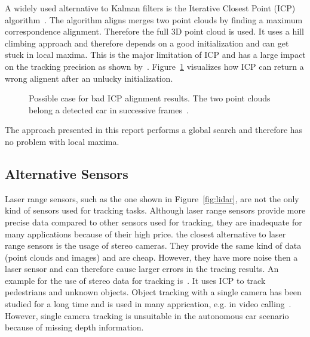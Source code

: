 \documentclass[twoside,a4paper,article]{combine}
\begin{document}
A widely used alternative to Kalman filters is the Iterative Closest
Point (ICP) algorithm~\cite{icp, icp2}. The algorithm aligns merges
two point clouds by finding a maximum correspondence
alignment. Therefore the full 3D point cloud is used. It
uses a hill climbing approach and therefore depends on a good
initialization and can get stuck in local maxima. This is the major
limitation of ICP and has a large impact on the tracking precision as
shown by~\cite{icp-bad, icp-bad2}. Figure~\ref{fig:icp} visualizes how
ICP can return a wrong alignent after an unlucky initialization.
\begin{figure}
  \label{fig:icp}
  \center
  
  \caption{Possible case for bad ICP alignment results. The two point
    clouds belong a detected car in successive frames~\cite{held-website}.}
\end{figure}
The approach presented in this report performs a global search and
therefore has no problem with local maxima.

\subsection{Alternative Sensors}
\label{sub:slternative-sensors}
Laser range sensors, such as the one shown in Figure~\ref{fig:lidar},
are not the only kind of sensors used for tracking tasks. Although
laser range sensors provide more precise data compared to other
sensors used for tracking, they are inadequate
for many applications because of their high price. the closest
alternative to laser range sensors is the usage of stereo
cameras. They provide the same kind of data (point clouds and images)
and are cheap. However, they have more noise then a laser sensor and
can therefore cause larger errors in the tracing results. An example
for the use of stereo data for tracking
is~\cite{leibe-tracking-before-detection}. It uses ICP to track
pedestrians and unknown objects. Object tracking with a single camera
has been studied for a long time and is used in many apprication,
e.g. in video calling~\cite{single-camera-tracking}. However, single
camera tracking is unsuitable in the autonomous car scenario because
of missing depth information.
\end{document}
